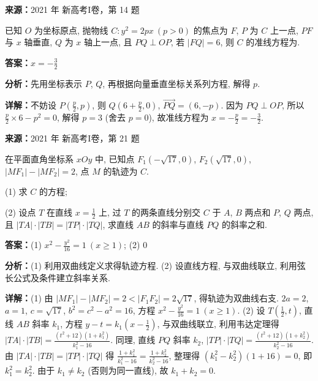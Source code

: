 \begin{question}[points=5]
\textbf{来源：}2021 年 新高考I卷，第 14 题\par
已知 $O$ 为坐标原点, 抛物线 $C: y^2 = 2px \ (p > 0)$ 的焦点为 $F$, $P$ 为 $C$ 上一点, $PF$ 与 $x$ 轴垂直, $Q$ 为 $x$ 轴上一点, 且 $PQ \perp OP$, 若 $|FQ| = 6$, 则 $C$ 的准线方程为.
\fillin[{$x = -\frac{3}{2}$}]
\begin{solution}
\textbf{答案：}$x = -\frac{3}{2}$

\textbf{分析：}先用坐标表示 $P$, $Q$, 再根据向量垂直坐标关系列方程, 解得 $p$.

\textbf{详解：}不妨设 $P\left(\frac{p}{2}, p\right)$, 则 $Q\left(6 + \frac{p}{2}, 0\right)$, $\overrightarrow{PQ} = (6, -p)$. 因为 $PQ \perp OP$, 所以 $\frac{p}{2} \times 6 - p^2 = 0$, 解得 $p = 3$ (舍去 $p=0$), 故准线方程为 $x = -\frac{p}{2} = -\frac{3}{2}$.
\end{solution}
\end{question}

\begin{question}[points=12]
\textbf{来源：}2021 年 新高考I卷，第 21 题\par
在平面直角坐标系 $xOy$ 中, 已知点 $F_1(-\sqrt{17}, 0)$, $F_2(\sqrt{17}, 0)$, $|MF_1| - |MF_2| = 2$, 点 $M$ 的轨迹为 $C$.

(1) 求 $C$ 的方程;

(2) 设点 $T$ 在直线 $x = \frac{1}{2}$ 上, 过 $T$ 的两条直线分别交 $C$ 于 $A$, $B$ 两点和 $P$, $Q$ 两点, 且 $|TA| \cdot |TB| = |TP| \cdot |TQ|$, 求直线 $AB$ 的斜率与直线 $PQ$ 的斜率之和.
\begin{solution}
\textbf{答案：}(1) $x^2 - \frac{y^2}{16} = 1 \ (x \geq 1)$; (2) $0$

\textbf{分析：}(1) 利用双曲线定义求得轨迹方程. (2) 设直线方程, 与双曲线联立, 利用弦长公式及条件建立斜率关系.

\textbf{详解：}(1) 由 $|MF_1| - |MF_2| = 2 < |F_1F_2| = 2\sqrt{17}$, 得轨迹为双曲线右支. $2a = 2$, $a = 1$, $c = \sqrt{17}$, $b^2 = c^2 - a^2 = 16$, 方程 $x^2 - \frac{y^2}{16} = 1 \ (x \geq 1)$.
(2) 设 $T(\frac{1}{2}, t)$, 直线 $AB$ 斜率 $k_1$, 方程 $y - t = k_1(x - \frac{1}{2})$, 与双曲线联立, 利用韦达定理得 $|TA| \cdot |TB| = \frac{(t^2+12)(1+k_1^2)}{k_1^2-16}$. 同理, 直线 $PQ$ 斜率 $k_2$, $|TP| \cdot |TQ| = \frac{(t^2+12)(1+k_2^2)}{k_2^2-16}$. 由 $|TA| \cdot |TB| = |TP| \cdot |TQ|$ 得 $\frac{1+k_1^2}{k_1^2-16} = \frac{1+k_2^2}{k_2^2-16}$, 整理得 $(k_1^2 - k_2^2)(1+16)=0$, 即 $k_1^2 = k_2^2$. 由于 $k_1 \neq k_2$ (否则为同一直线), 故 $k_1 + k_2 = 0$.
\end{solution}
\end{question}

